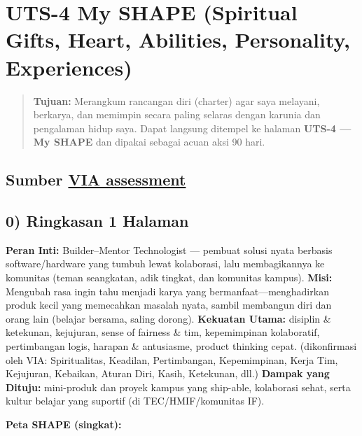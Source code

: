 \documentclass[
  letterpaper,
  DIV=11,
  numbers=noendperiod]{scrreprt}
\begin{document}

\chapter{UTS-4 My SHAPE (Spiritual Gifts, Heart, Abilities, Personality,
Experiences)}\label{uts-4-my-shape-spiritual-gifts-heart-abilities-personality-experiences}

\begin{quote}
\textbf{Tujuan:} Merangkum rancangan diri (charter) agar saya melayani,
berkarya, dan memimpin secara paling selaras dengan karunia dan
pengalaman hidup saya. Dapat langsung ditempel ke halaman \textbf{UTS-4
--- My SHAPE} dan dipakai sebagai acuan aksi 90 hari.
\end{quote}

\section{\texorpdfstring{Sumber
\href{StrengthsProfile-Muhammad-Farrel.pdf}{VIA
assessment}}{Sumber VIA assessment}}\label{sumber-via-assessment}

\section{0) Ringkasan 1 Halaman}\label{ringkasan-1-halaman}

\textbf{Peran Inti:} Builder--Mentor Technologist --- pembuat solusi
nyata berbasis software/hardware yang tumbuh lewat kolaborasi, lalu
membagikannya ke komunitas (teman seangkatan, adik tingkat, dan
komunitas kampus). \textbf{Misi:} Mengubah rasa ingin tahu menjadi karya
yang bermanfaat---menghadirkan produk kecil yang memecahkan masalah
nyata, sambil membangun diri dan orang lain (belajar bersama, saling
dorong). \textbf{Kekuatan Utama:} disiplin \& ketekunan, kejujuran,
sense of fairness \& tim, kepemimpinan kolaboratif, pertimbangan logis,
harapan \& antusiasme, product thinking cepat. (dikonfirmasi oleh VIA:
Spiritualitas, Keadilan, Pertimbangan, Kepemimpinan, Kerja Tim,
Kejujuran, Kebaikan, Aturan Diri, Kasih, Ketekunan, dll.) \textbf{Dampak
yang Dituju:} mini-produk dan proyek kampus yang ship-able, kolaborasi
sehat, serta kultur belajar yang suportif (di TEC/HMIF/komunitas IF).

\textbf{Peta SHAPE (singkat):}
\end{document}
